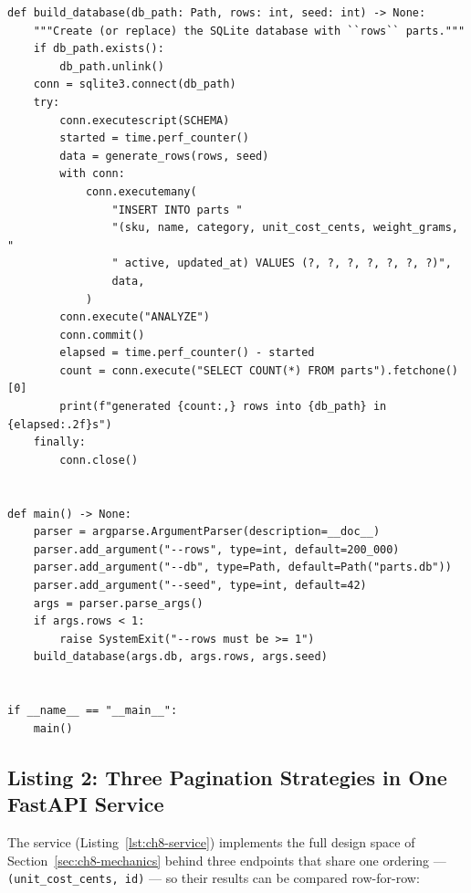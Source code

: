 \begin{verbatim}
def build_database(db_path: Path, rows: int, seed: int) -> None:
    """Create (or replace) the SQLite database with ``rows`` parts."""
    if db_path.exists():
        db_path.unlink()
    conn = sqlite3.connect(db_path)
    try:
        conn.executescript(SCHEMA)
        started = time.perf_counter()
        data = generate_rows(rows, seed)
        with conn:
            conn.executemany(
                "INSERT INTO parts "
                "(sku, name, category, unit_cost_cents, weight_grams, "
                " active, updated_at) VALUES (?, ?, ?, ?, ?, ?, ?)",
                data,
            )
        conn.execute("ANALYZE")
        conn.commit()
        elapsed = time.perf_counter() - started
        count = conn.execute("SELECT COUNT(*) FROM parts").fetchone()[0]
        print(f"generated {count:,} rows into {db_path} in {elapsed:.2f}s")
    finally:
        conn.close()


def main() -> None:
    parser = argparse.ArgumentParser(description=__doc__)
    parser.add_argument("--rows", type=int, default=200_000)
    parser.add_argument("--db", type=Path, default=Path("parts.db"))
    parser.add_argument("--seed", type=int, default=42)
    args = parser.parse_args()
    if args.rows < 1:
        raise SystemExit("--rows must be >= 1")
    build_database(args.db, args.rows, args.seed)


if __name__ == "__main__":
    main()
\end{verbatim}

\subsection{Listing 2: Three Pagination Strategies in One FastAPI Service}
\label{subsec:ch8-code-service}

The service (Listing~\ref{lst:ch8-service}) implements the full design space
of Section~\ref{sec:ch8-mechanics} behind three endpoints that share one
ordering --- \texttt{(unit\_cost\_cents, id)} --- so their results can be
compared row-for-row:

